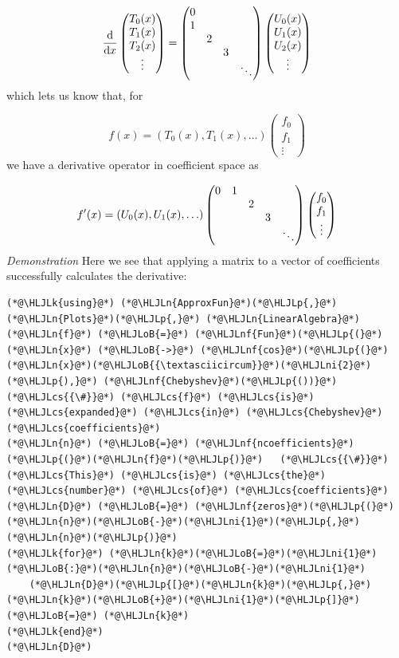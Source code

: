 \documentclass[12pt,a4paper]{article}
\newcommand{\HLJLk}[1]{\textcolor[RGB]{148,91,176}{\textbf{#1}}}
\newcommand{\HLJLn}[1]{#1}
\newcommand{\HLJLnf}[1]{\textcolor[RGB]{66,102,213}{#1}}
\newcommand{\HLJLni}[1]{\textcolor[RGB]{59,151,46}{#1}}
\newcommand{\HLJLoB}[1]{\textcolor[RGB]{102,102,102}{\textbf{#1}}}
\newcommand{\HLJLp}[1]{#1}
\newcommand{\HLJLcs}[1]{\textcolor[RGB]{153,153,119}{\textit{#1}}}
\begin{document}
\[
{{\rm d} \over {\rm d}x}  \begin{pmatrix} T_0(x) \\ T_1(x) \\ T_2(x) \\ \vdots \end{pmatrix}= \begin{pmatrix}
0 \cr
1 \cr
& 2 \cr
&& 3 \cr
&&&\ddots
\end{pmatrix} \begin{pmatrix} U_0(x) \\ U_1(x) \\ U_2(x) \\ \vdots \end{pmatrix}
\]
which lets us know that, for

\[
f(x) = (T_0(x),T_1(x),\ldots) \begin{pmatrix} f_0\\f_1\\\vdots \end{pmatrix}
\]
we have a derivative operator in coefficient space as

\[
f'(x) = (U_0(x),U_1(x),\ldots)\begin{pmatrix}
0 & 1 \cr
&& 2 \cr
&&& 3 \cr
&&&&\ddots
\end{pmatrix}  \begin{pmatrix} f_0\\f_1\\\vdots \end{pmatrix}
\]
\emph{Demonstration} Here we see that applying a matrix to a vector of coefficients successfully calculates the derivative:


\begin{lstlisting}
(*@\HLJLk{using}@*) (*@\HLJLn{ApproxFun}@*)(*@\HLJLp{,}@*) (*@\HLJLn{Plots}@*)(*@\HLJLp{,}@*) (*@\HLJLn{LinearAlgebra}@*)
(*@\HLJLn{f}@*) (*@\HLJLoB{=}@*) (*@\HLJLnf{Fun}@*)(*@\HLJLp{(}@*)(*@\HLJLn{x}@*) (*@\HLJLoB{->}@*) (*@\HLJLnf{cos}@*)(*@\HLJLp{(}@*)(*@\HLJLn{x}@*)(*@\HLJLoB{{\textasciicircum}}@*)(*@\HLJLni{2}@*)(*@\HLJLp{),}@*) (*@\HLJLnf{Chebyshev}@*)(*@\HLJLp{())}@*)   (*@\HLJLcs{{\#}}@*) (*@\HLJLcs{f}@*) (*@\HLJLcs{is}@*) (*@\HLJLcs{expanded}@*) (*@\HLJLcs{in}@*) (*@\HLJLcs{Chebyshev}@*) (*@\HLJLcs{coefficients}@*)
(*@\HLJLn{n}@*) (*@\HLJLoB{=}@*) (*@\HLJLnf{ncoefficients}@*)(*@\HLJLp{(}@*)(*@\HLJLn{f}@*)(*@\HLJLp{)}@*)   (*@\HLJLcs{{\#}}@*) (*@\HLJLcs{This}@*) (*@\HLJLcs{is}@*) (*@\HLJLcs{the}@*) (*@\HLJLcs{number}@*) (*@\HLJLcs{of}@*) (*@\HLJLcs{coefficients}@*)
(*@\HLJLn{D}@*) (*@\HLJLoB{=}@*) (*@\HLJLnf{zeros}@*)(*@\HLJLp{(}@*)(*@\HLJLn{n}@*)(*@\HLJLoB{-}@*)(*@\HLJLni{1}@*)(*@\HLJLp{,}@*)(*@\HLJLn{n}@*)(*@\HLJLp{)}@*)
(*@\HLJLk{for}@*) (*@\HLJLn{k}@*)(*@\HLJLoB{=}@*)(*@\HLJLni{1}@*)(*@\HLJLoB{:}@*)(*@\HLJLn{n}@*)(*@\HLJLoB{-}@*)(*@\HLJLni{1}@*)
    (*@\HLJLn{D}@*)(*@\HLJLp{[}@*)(*@\HLJLn{k}@*)(*@\HLJLp{,}@*)(*@\HLJLn{k}@*)(*@\HLJLoB{+}@*)(*@\HLJLni{1}@*)(*@\HLJLp{]}@*) (*@\HLJLoB{=}@*) (*@\HLJLn{k}@*)
(*@\HLJLk{end}@*)
(*@\HLJLn{D}@*)
\end{lstlisting}
\end{document}
